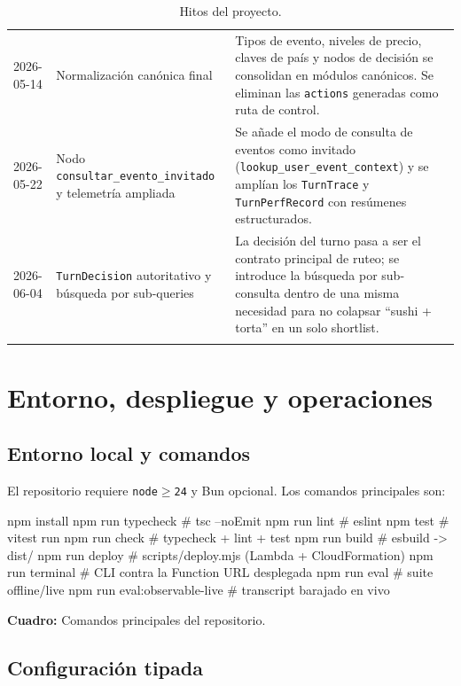 \documentclass[11pt,a4paper]{article}
\begin{document}
\begin{longtable}{p{2.4cm}p{4.0cm}p{9.0cm}}
2026-05-14 & Normalización canónica final &
Tipos de evento, niveles de precio, claves de país y nodos de
decisión se consolidan en módulos canónicos. Se eliminan las
\texttt{actions} generadas como ruta de control. \\

2026-05-22 & Nodo \texttt{consultar\_evento\_invitado} y telemetría ampliada &
Se añade el modo de consulta de eventos como invitado
(\texttt{lookup\_user\_event\_context}) y se amplían los
\texttt{TurnTrace} y \texttt{TurnPerfRecord} con resúmenes
estructurados. \\

2026-06-04 & \texttt{TurnDecision} autoritativo y búsqueda por sub-queries &
La decisión del turno pasa a ser el contrato principal de ruteo; se
introduce la búsqueda por sub-consulta dentro de una misma
necesidad para no colapsar ``sushi + torta'' en un solo shortlist. \\

\bottomrule
\caption{Hitos del proyecto.}
\label{tab:hitos}
\end{longtable}

\section{Entorno, despliegue y operaciones}

\subsection{Entorno local y comandos}

El repositorio requiere \texttt{node$\geq$24} y Bun opcional. Los
comandos principales son:

\begin{codeblock}
npm install
npm run typecheck   # tsc --noEmit
npm run lint        # eslint
npm test            # vitest run
npm run check       # typecheck + lint + test
npm run build       # esbuild -> dist/
npm run deploy      # scripts/deploy.mjs (Lambda + CloudFormation)
npm run terminal    # CLI contra la Function URL desplegada
npm run eval        # suite offline/live
npm run eval:observable-live  # transcript barajado en vivo
\end{codeblock}

\noindent\textbf{Cuadro:} Comandos principales del repositorio.

\subsection{Configuración tipada}
\end{document}
